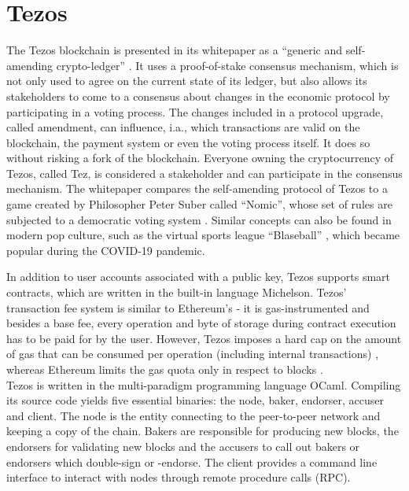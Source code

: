 \section{Tezos}\label{sec:tezos}
The Tezos blockchain is presented in its whitepaper as a \enquote{generic and self-amending crypto-ledger} \cite{goodman_tezos_2014}. It uses a proof-of-stake consensus mechanism, which is not only used to agree on the current state of its ledger, but also allows its stakeholders to come to a consensus about changes in the economic protocol by participating in a voting process. The changes included in a protocol upgrade, called amendment, can influence, i.a., which transactions are valid on the blockchain, the payment system or even the voting process itself. It does so without risking a fork of the blockchain. Everyone owning the cryptocurrency of Tezos, called Tez, is considered a stakeholder and can participate in the consensus mechanism. The whitepaper compares the self-amending protocol of Tezos to a game created by Philosopher Peter Suber called ``Nomic'', whose set of rules are subjected to a democratic voting system \cite{nomic}. Similar concepts can also be found in modern pop culture, such as the virtual sports league ``Blaseball'' \cite{blaseball}, which became popular during the COVID-19 pandemic.

In addition to user accounts associated with a public key, Tezos supports smart contracts, which are written in the built-in language Michelson. Tezos' transaction fee system is similar to Ethereum's \cite{wood_ethereum_2021} - it is gas-instrumented and besides a base fee, every operation and byte of storage during contract execution has to be paid for by the user. However, Tezos imposes a hard cap on the amount of gas that can be consumed per operation (including internal transactions) \cite{tezos_docs}\cite{morley_repo}, whereas Ethereum limits the gas quota only in respect to blocks \cite{wood_ethereum_2021}.\\
Tezos is written in the multi-paradigm programming language OCaml. Compiling its source code yields five essential binaries: the  node, baker, endorser, accuser and client. The node is the entity connecting to the peer-to-peer network and keeping a copy of the chain. Bakers are responsible for producing new blocks, the endorsers for validating new blocks and the accusers to call out bakers or endorsers which double-sign or -endorse. The client provides a command line interface to interact with nodes through remote procedure calls (RPC). 

